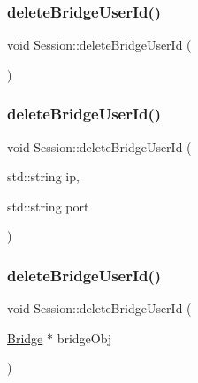 \subsubsection{\texorpdfstring{delete\+Bridge\+User\+Id()}{deleteBridgeUserId()}\hspace{0.1cm}{\footnotesize\ttfamily [1/3]}}
{\footnotesize\ttfamily void Session\+::delete\+Bridge\+User\+Id (\begin{DoxyParamCaption}{ }\end{DoxyParamCaption})}

\mbox{\label{class_session_ae72de69f3e1a148bc633b348e984bf63}} 
\subsubsection{\texorpdfstring{delete\+Bridge\+User\+Id()}{deleteBridgeUserId()}\hspace{0.1cm}{\footnotesize\ttfamily [2/3]}}
{\footnotesize\ttfamily void Session\+::delete\+Bridge\+User\+Id (\begin{DoxyParamCaption}\item[{std\+::string}]{ip,  }\item[{std\+::string}]{port }\end{DoxyParamCaption})}

\mbox{\label{class_session_add42d80da3d9dd34278e753ef623a7c8}} 
\subsubsection{\texorpdfstring{delete\+Bridge\+User\+Id()}{deleteBridgeUserId()}\hspace{0.1cm}{\footnotesize\ttfamily [3/3]}}
{\footnotesize\ttfamily void Session\+::delete\+Bridge\+User\+Id (\begin{DoxyParamCaption}\item[{\hyperlink{class_bridge}{Bridge} $\ast$}]{bridge\+Obj }\end{DoxyParamCaption})}

\mbox{\label{class_session_a649a79834856c8584935f06ea572ed62}} 
